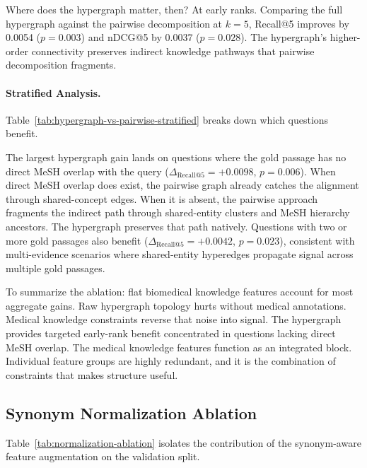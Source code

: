 

Where does the hypergraph matter, then? At early ranks. Comparing the full hypergraph against the pairwise decomposition at $k{=}5$, Recall@5 improves by 0.0054 ($p{=}0.003$) and nDCG@5 by 0.0037 ($p{=}0.028$). The hypergraph's higher-order connectivity preserves indirect knowledge pathways that pairwise decomposition fragments.

\paragraph{Stratified Analysis.}
Table~\ref{tab:hypergraph-vs-pairwise-stratified} breaks down which questions benefit.



The largest hypergraph gain lands on questions where the gold passage has no direct MeSH overlap with the query ($\Delta_{\text{Recall@5}} = +0.0098$, $p=0.006$). When direct MeSH overlap does exist, the pairwise graph already catches the alignment through shared-concept edges. When it is absent, the pairwise approach fragments the indirect path through shared-entity clusters and MeSH hierarchy ancestors. The hypergraph preserves that path natively. Questions with two or more gold passages also benefit ($\Delta_{\text{Recall@5}} = +0.0042$, $p=0.023$), consistent with multi-evidence scenarios where shared-entity hyperedges propagate signal across multiple gold passages.

To summarize the ablation: flat biomedical knowledge features account for most aggregate gains. Raw hypergraph topology hurts without medical annotations. Medical knowledge constraints reverse that noise into signal. The hypergraph provides targeted early-rank benefit concentrated in questions lacking direct MeSH overlap. The medical knowledge features function as an integrated block. Individual feature groups are highly redundant, and it is the combination of constraints that makes structure useful.

\subsection{Synonym Normalization Ablation}
\label{sec:normalization-ablation}

Table~\ref{tab:normalization-ablation} isolates the contribution of the synonym-aware feature augmentation on the validation split.



